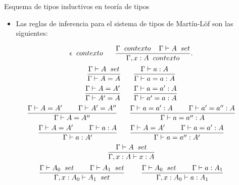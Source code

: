 \documentclass[dvipsnames, 8pt]{beamer} %
\theoremstyle{plain}
\theoremstyle{definition}
\begin{document}
\begin{frame}{Esquema de tipos inductivos en teoría de tipos}
    \begin{itemize}
        \item Las reglas de inferencia para el sistema de tipos de Martín-Löf son las siguientes:\pause
    \end{itemize}
    $$\epsilon \hspace{2mm} contexto \hspace{6mm} \frac{\Gamma\hspace{2mm} contexto \hspace{4mm} \Gamma \vdash A \hspace{2mm} set}{\Gamma,x:A \hspace{2mm} contexto}.$$
    \vspace{0.3mm}
    $$\frac{\Gamma \vdash A \hspace{2mm} set}{\Gamma \vdash A = A} \hspace{6mm} \frac{\Gamma \vdash a : A}{\Gamma \vdash a = a : A}$$
    \vspace{0.3mm}
    $$\frac{\Gamma \vdash A = A'}{\Gamma \vdash A' = A} \hspace{6mm} \frac{\Gamma \vdash a = a' : A}{\Gamma \vdash a' = a : A}$$
    \vspace{0.3mm}
    $$\frac{\Gamma \vdash A = A' \hspace{8mm} \Gamma \vdash A' = A''}{\Gamma \vdash A = A''} \hspace{6mm} \frac{\Gamma \vdash a = a' : A \hspace{8mm} \Gamma \vdash a' = a'' : A}{\Gamma \vdash a = a'' : A}$$
    \vspace{0.3mm}
    $$\frac{\Gamma \vdash A = A' \hspace{8mm} \Gamma \vdash a : A}{\Gamma \vdash a : A'} \hspace{6mm} \frac{\Gamma \vdash A = A' \hspace{8mm} \Gamma \vdash a = a' : A}{\Gamma \vdash a = a'' : A'}$$
    \vspace{0.3mm}
    $$\frac{\Gamma\vdash A \hspace{2mm} set}{\Gamma, x:A \vdash x:A}$$
    \vspace{0.3mm}
    $$\frac{\Gamma\vdash A_{0} \hspace{2mm} set \hspace{8mm} \Gamma\vdash A_{1} \hspace{2mm} set}{\Gamma, x:A_{0} \vdash A_{1} \hspace{2mm}set} \hspace{8mm} \frac{\Gamma\vdash A_{0} \hspace{2mm} set \hspace{8mm} \Gamma\vdash a:A_{1}}{\Gamma, x:A_{0} \vdash a:A_{1}}$$
\end{frame}
\end{document}
